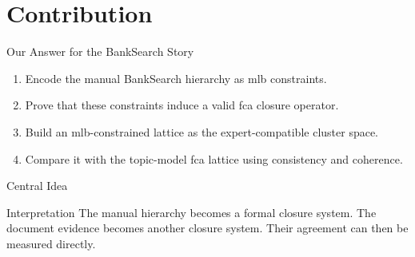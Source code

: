 \section{Contribution}

\begin{frame}{Our Answer for the BankSearch Story}
\begin{enumerate}
    \item Encode the manual BankSearch hierarchy as \ac{mlb} constraints.
    \item Prove that these constraints induce a valid \ac{fca} closure operator.
    \item Build an \ac{mlb}-constrained lattice as the expert-compatible cluster space.
    \item Compare it with the topic-model \ac{fca} lattice using consistency and coherence.
\end{enumerate}
\end{frame}

\begin{frame}{Central Idea}
\begin{center}
\end{center}

\begin{block}{Interpretation}
The manual hierarchy becomes a formal closure system. The document evidence becomes another closure system. Their agreement can then be measured directly.
\end{block}
\end{frame}

